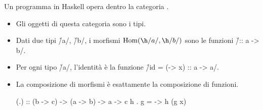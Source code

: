 \begin{frame}[fragile]
Un programma in Haskell opera dentro la categoria \Hask{}.
\begin{itemize}[<+(1)->]
\item Gli oggetti di questa categoria sono i tipi.
\item Dati due tipi \h/a/, \h/b/, i morfismi $\Hom(\h/a/, \h/b/)$ sono le funzioni \h/:: a -> b/.
\item Per ogni tipo \h/a/, l'identità è la funzione \h/id = (\x -> x) :: a -> a/.
\item La composizione di morfismi è esattamente la composizione di funzioni.

\begin{haskellcode}
(.) :: (b -> c) -> (a -> b) -> a -> c
h . g = \x -> h (g x)
\end{haskellcode}

\end{itemize}
\end{frame} 

